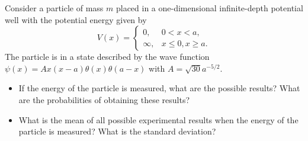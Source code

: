 \documentclass[12pt,a4paper]{article}
\newenvironment{problem}[2][Problem]{\begin{trivlist}
\item[\hskip \labelsep {\bfseries #1}\hskip \labelsep {\bfseries #2.}]}{\end{trivlist}}
\begin{document}
\begin{problem}{4}
Consider a particle of mass $m$ placed in a one-dimensional infinite-depth potential well with the potential energy given by
\[
V(x)=
\left\{\begin{array}{ll}
0,&0<x<a,\\
\infty,&x\leq0,x\geq a.
\end{array}\right.
\]
The particle is in a state described by the wave function $\psi(x)=Ax(x-a)\theta(x)\theta(a-x)$ with $A=\sqrt{30}a^{-5/2}$.
\begin{itemize}
\item[(a)] If the energy of the particle is measured, what are the possible results? What are the probabilities of obtaining these results?
\item[(b)] What is the mean of all possible experimental results when the energy of the particle is measured? What is the standard deviation?
\end{itemize}
\end{problem}
\end{document}
